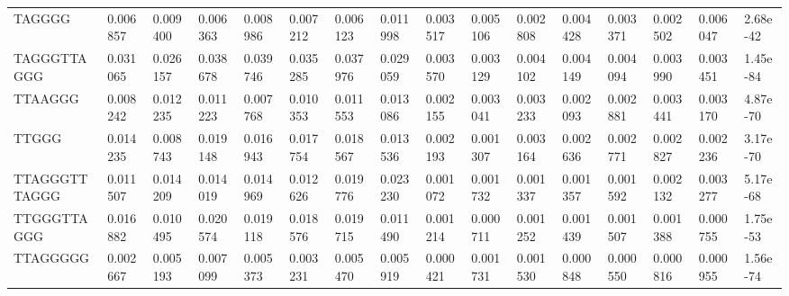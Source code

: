 \begin{samepage}
\begin{table}[h!]
\begin{tabular}{llllllllllllllll}
TAGGGG            &  0.006857                                          &  0.009400                            &  0.006363                 &  0.008986        &  0.007212        &  0.006123        &  0.011998        &  0.003517        &  0.005106        &  0.002808        &  0.004428        &  0.003371        &  0.002502        &  0.006047        &  2.68e-42 \\
TAGGGTTAGGG       &  0.031065                                          &  0.026157                            &  0.038678                 &  0.039746        &  0.035285        &  0.037976        &  0.029059        &  0.003570        &  0.003129        &  0.004102        &  0.004149        &  0.004094        &  0.003990        &  0.003451        &  1.45e-84 \\
TTAAGGG           &  0.008242                                          &  0.012235                            &  0.011223                 &  0.007768        &  0.010353        &  0.011553        &  0.013086        &  0.002155        &  0.003041        &  0.003233        &  0.002093        &  0.002881        &  0.003441        &  0.003170        &  4.87e-70 \\
TTGGG             &  0.014235                                          &  0.008743                            &  0.019148                 &  0.016943        &  0.017754        &  0.018567        &  0.013536        &  0.002193        &  0.001307        &  0.003164        &  0.002636        &  0.002771        &  0.002827        &  0.002236        &  3.17e-70 \\
TTAGGGTTTAGGG     &  0.011507                                          &  0.014209                            &  0.014019                 &  0.014969        &  0.012626        &  0.019776        &  0.023230        &  0.001072        &  0.001732        &  0.001337        &  0.001357        &  0.001592        &  0.002132        &  0.003277        &  5.17e-68 \\
TTGGGTTAGGG       &  0.016882                                          &  0.010495                            &  0.020574                 &  0.019118        &  0.018576        &  0.019715        &  0.011490        &  0.001214        &  0.000711        &  0.001252        &  0.001439        &  0.001507        &  0.001388        &  0.000755        &  1.75e-53 \\
TTAGGGGG          &  0.002667                                          &  0.005193                            &  0.007099                 &  0.005373        &  0.003231        &  0.005470        &  0.005919        &  0.000421        &  0.001731        &  0.001530        &  0.000848        &  0.000550        &  0.000816        &  0.000955        &  1.56e-74 \\

\end{tabular}
\end{table}
\end{samepage}
